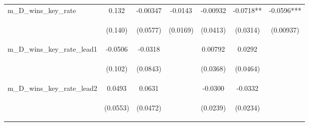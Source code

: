 \documentclass[]{article}
\begin{document}
\begin{center}
\begin{tabular}{lcccccc}
m\_D\_wins\_key\_rate & 0.132 & -0.00347 & -0.0143 & -0.00932 & -0.0718** & -0.0596*** \\
\vspace{4pt} & \begin{footnotesize}(0.140)\end{footnotesize} & \begin{footnotesize}(0.0577)\end{footnotesize} & \begin{footnotesize}(0.0169)\end{footnotesize} & \begin{footnotesize}(0.0413)\end{footnotesize} & \begin{footnotesize}(0.0314)\end{footnotesize} & \begin{footnotesize}(0.00937)\end{footnotesize} \\
m\_D\_wins\_key\_rate\_lead1 & -0.0506 & -0.0318 &  & 0.00792 & 0.0292 &  \\
\vspace{4pt} & \begin{footnotesize}(0.102)\end{footnotesize} & \begin{footnotesize}(0.0843)\end{footnotesize} & \begin{footnotesize}\end{footnotesize} & \begin{footnotesize}(0.0368)\end{footnotesize} & \begin{footnotesize}(0.0464)\end{footnotesize} & \begin{footnotesize}\end{footnotesize} \\
m\_D\_wins\_key\_rate\_lead2 & 0.0493 & 0.0631 &  & -0.0300 & -0.0332 &  \\
\vspace{4pt} & \begin{footnotesize}(0.0553)\end{footnotesize} & \begin{footnotesize}(0.0472)\end{footnotesize} & \begin{footnotesize}\end{footnotesize} & \begin{footnotesize}(0.0239)\end{footnotesize} & \begin{footnotesize}(0.0234)\end{footnotesize} & \begin{footnotesize}\end{footnotesize} \\

\end{tabular}
\end{center}
\end{document}

